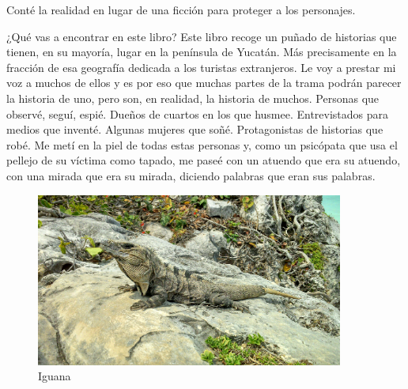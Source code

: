 \documentclass[11pt,twoside,openright,a6paper]{book}
\begin{document}
\vspace{0.5cm}
\hrulefill\hspace{0.2cm} \decofourleft\decofourright \hspace{0.2cm} \hrulefill
\vspace{0.5cm}

Conté la realidad en lugar de una ficción para proteger a los personajes.


\vspace{0.5cm}
\hrulefill\hspace{0.2cm} \decofourleft\decofourright \hspace{0.2cm} \hrulefill
\vspace{0.5cm}

¿Qué vas a encontrar en este libro? Este libro recoge un puñado
de historias que tienen, en su mayoría, lugar en la península de
Yucatán. Más precisamente en la fracción de esa geografía dedicada a
los turistas extranjeros. Le voy a prestar mi voz a muchos de ellos y es
por eso que muchas partes de la trama podrán parecer la historia de uno,
pero son, en realidad, la historia de muchos. Personas que observé, seguí,
espié. Dueños de cuartos en los que husmee. Entrevistados para medios
que inventé. Algunas mujeres que soñé. Protagonistas de historias que
robé. Me metí en la piel de todas estas personas y, como un psicópata
que usa el pellejo de su víctima como tapado, me paseé con un atuendo
que era su atuendo, con una mirada que era su mirada, diciendo palabras
que eran sus palabras.

\begin{figure}[H]
  \centering
    \includegraphics[width=0.9\textwidth]{fotos/2013/iguana}
  \caption{Iguana}
  \label{Iguana}
\end{figure}
\end{document}
